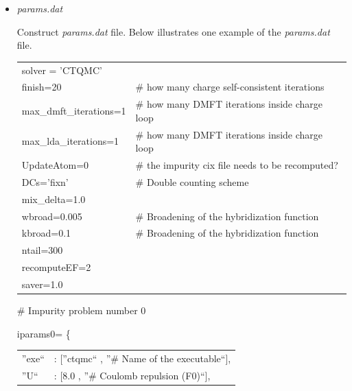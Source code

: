 \documentclass[12 pt]{article}
\begin{document}
	    \begin{itemize}

	    \item \emph{params.dat}

  Construct \emph{params.dat} file. Below illustrates one example of the \emph{params.dat} file. 

{\color{cyan}

  \begin{tabular}{ll}

  solver = 'CTQMC'			& \\

  finish=20				& \# how many charge self-consistent iterations\\

  max\_dmft\_iterations=1		& \# how many DMFT iterations inside charge loop\\

  max\_lda\_iterations=1		& \# how many DMFT iterations inside charge loop\\

  UpdateAtom=0				& \# the impurity cix file needs to be recomputed?\\

  DCs='fixn'				& \# Double counting scheme\\

  mix\_delta=1.0			& \\

  wbroad=0.005				& \# Broadening of the hybridization function\\

  kbroad=0.1				& \# Broadening of the hybridization function\\

  ntail=300				& \\

  recomputeEF=2				& \\

  saver=1.0				& \\

  \end{tabular}  

  \# Impurity problem number 0	

  iparams0= \{

  \begin{tabular}{ll}
   
	    ''exe``	& : [''ctqmc``		, ''\# Name of the executable``],\\

	    ''U``	& : [8.0			, ''\# Coulomb repulsion (F0)``],\\


\end{tabular}}
\end{itemize}
\end{document}
